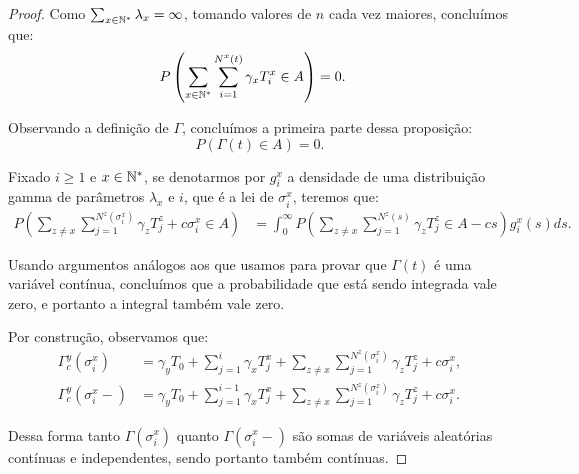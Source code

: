 \begin{proof}
  Como $\sum_{x \in {\mathbb{N^*}}} \lambda_x = \infty$, tomando valores de $n$
  cada vez maiores, concluímos que:
  \begin{align*}
    P\left(\sum_{x \in {\mathbb{N^*}}}\sum_{i = 1}^{N^x(t)} \gamma_x T_i^x \in A \right) 
    &= 0.
  \end{align*}

  Observando a definição de $\Gamma$, concluímos a primeira
  parte dessa proposição:
  \begin{displaymath}
    P\left( \Gamma(t) \in A \right) = 0.
  \end{displaymath}


  Fixado $i \geq 1$ e $x \in {\mathbb{N^*}}$, se denotarmos por $g^x_i$ a
  densidade de uma distribuição gamma de parâmetros $\lambda_x$ e $i$,
  que é a lei de $\sigma^x_i$, teremos que:
  \begin{align*}
    P \left(
      \sum_{z \neq x} \sum_{j = 1}^{N^z(\sigma^x_i)} \gamma_z T^z_j
      + c \sigma^x_i
      \in A
    \right)
    &= \int_0^\infty
     P \left(
      \sum_{z \neq x} \sum_{j = 1}^{N^z(s)} \gamma_z T^z_j
      \in A - c s
    \right)
    g_i^x (s) d s.
  \end{align*}

  Usando argumentos análogos aos que usamos para provar que
  $\Gamma(t)$ é uma variável contínua, concluímos que a probabilidade
  que está sendo integrada vale zero, e portanto a integral também
  vale zero.

  Por construção, observamos que:
  \begin{align*}
    \Gamma^y_c(\sigma^x_i)  &=
     \gamma_y T_0 + \sum_{j = 1}^{i} \gamma_x
    T_j^x + \sum_{z \neq x} \sum_{j = 1}^{N^z(\sigma^x_i)} \gamma_z
    T^z_j + c \sigma^x_i,\\
    \Gamma^y_c(\sigma^x_i -)  &=
     \gamma_y T_0 + \sum_{j = 1}^{i-1} \gamma_x
    T_j^x + \sum_{z \neq x} \sum_{j = 1}^{N^z(\sigma_i^x)} \gamma_z
    T^z_j + c \sigma_i^x.
  \end{align*}

  Dessa forma tanto $\Gamma(\sigma^x_i)$ quanto $\Gamma(\sigma^x_i-)$
  são somas de variáveis aleatórias contínuas e independentes, sendo
  portanto também contínuas.
\end{proof}


